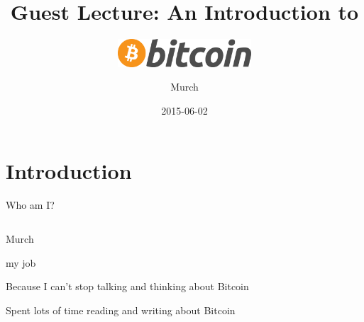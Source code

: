\documentclass[12pt, usepdftitle=false]{beamer}
\title[Bitcoin]{Guest Lecture: An Introduction to \vspace*{1em}}
\subtitle{\includegraphics[width=5cm]{btcLogo}}
\author{Murch}
\date{2015-06-02}
\begin{document}
\frame[plain]{\titlepage}

\frame{\tableofcontents}

\section{Introduction}
\frame{\tableofcontents[currentsection]}

\begin{frame}{Who am I?}
\begin{columns}[c]
\begin{column}{.7\textwidth}
	\begin{description}[leftmargin=0em]
		\item[Name:] Murch
		\item[Job:] my job 
		\item[Why here?] Because I can't stop talking and thinking about Bitcoin
		\item[Qualification:] Spent lots of time reading and writing about Bitcoin
	\end{description}
\end{column}
\begin{column}{.3\textwidth}
\end{column}
\end{columns}
\end{frame}
\end{document}
